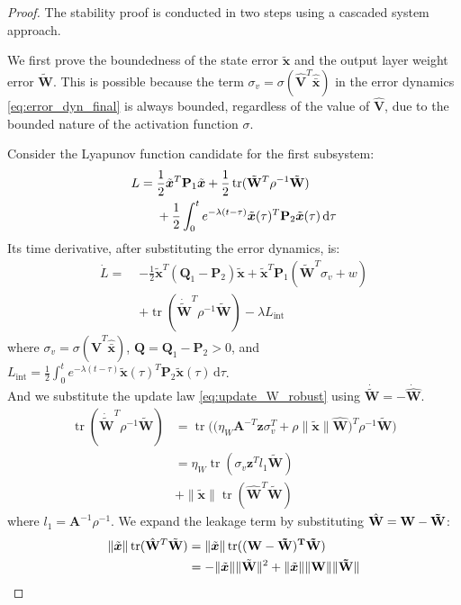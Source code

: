 \documentclass[10pt,twocolumn]{ICCAS}
\newcommand{\tr}{\operatorname{tr}}
\newcommand{\ud}{\,\mathrm{d}}
\newcommand{\xtilde}{\tilde{\bm{x}}}
\newcommand{\xhatbar}{\hat{\bar{\bm{x}}}}
\newcommand{\Wtilde}{\tilde{\mathbf{W}}}
\newcommand{\What}{\hat{\mathbf{W}}}
\newcommand{\Vhat}{\hat{\mathbf{V}}}
\begin{document}
\begin{proof}
The stability proof is conducted in two steps using a cascaded system approach.


We first prove the boundedness of the state error $\xtilde$ and the output layer weight error $\Wtilde$. This is possible because the term $\sigma_v = \sigma(\Vhat^T \xhatbar)$ in the error dynamics \eqref{eq:error_dyn_final} is always bounded, regardless of the value of $\Vhat$, due to the bounded nature of the activation function $\sigma$.

Consider the Lyapunov function candidate for the first subsystem:
\begin{align}
    L =\; & \frac{1}{2}\xtilde^T \mathbf{P}_1 \xtilde \notag + \frac{1}{2}\tr(\Wtilde^T \rho^{-1}\Wtilde) \notag \\
    & + \frac{1}{2} \int_{0}^{t} e^{-\lambda(t-\tau)} \xtilde(\tau)^T \mathbf{P}_2 \xtilde(\tau) \ud\tau
\end{align}
Its time derivative, after substituting the error dynamics, is:
\begin{align*}
    \dot{L} =\; & -\frac{1}{2}\xtilde^T(\mathbf{Q}_1 - \mathbf{P}_2)\xtilde+ \xtilde^T\mathbf{P}_1 (\Wtilde^T \sigma_v + w) \\
    &+ \tr(\dot{\Wtilde}^T\rho^{-1} \Wtilde) - \lambda L_{\text{int}}
\end{align*}
where $\sigma_v = \sigma(\Vhat^T\xhatbar)$, $\mathbf{Q} = \mathbf{Q}_1 - \mathbf{P}_2 > 0$, and $L_{\text{int}} = \frac{1}{2} \int_{0}^{t} e^{-\lambda(t-\tau)} \xtilde(\tau)^T \mathbf{P}_2 \xtilde(\tau) \ud\tau$.\\
And we substitute the update law \eqref{eq:update_W_robust} using $\dot{\Wtilde} = -\dot{\What}$. 
\begin{align*}
    \tr(\dot{\Wtilde}^T \rho^{-1}\Wtilde) 
    &= \tr\Big( \big(\eta_W \mathbf{A}^{-T}\bm{z}\sigma_v^T + \rho \|\xtilde\| \What\big)^T \rho^{-1}\Wtilde \Big) \\
    &= {\eta_W}\tr(\sigma_v \bm{z}^T l_1 \Wtilde)\\
    &+ \|\xtilde\| \tr(\What^T \Wtilde)
\end{align*}
where $l_1 = \mathbf{A}^{-1} \rho^{-1}$.
We expand the leakage term by substituting $\What =\bf{W} - \Wtilde$:
\begin{align*}
    \|\xtilde\| \tr(\What^T\Wtilde) &= \|\xtilde\| \tr((\bf{W} - \Wtilde)^T\Wtilde)\\&= -\|\xtilde\| \|\Wtilde\|^{2}+\|\xtilde\| \|\bf{W}\|\|\Wtilde\|

\end{align*}
\end{proof}
\end{document}
